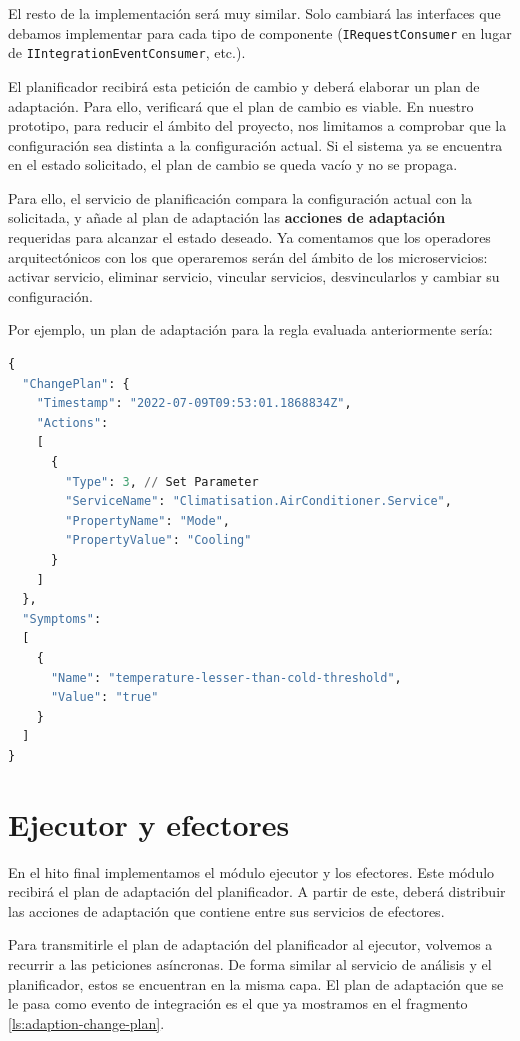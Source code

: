 El resto de la implementación será muy similar. Solo cambiará las interfaces que debamos implementar para cada tipo de componente (\texttt{IRequestConsumer} en lugar de \texttt{IIntegrationEventConsumer}, etc.).

El planificador recibirá esta petición de cambio y deberá elaborar un plan de adaptación. Para ello, verificará que el plan de cambio es viable. En nuestro prototipo, para reducir el ámbito del proyecto, nos limitamos a comprobar que la configuración sea distinta a la configuración actual. Si el sistema ya se encuentra en el estado solicitado, el plan de cambio se queda vacío y no se propaga.

Para ello, el servicio de planificación compara la configuración actual con la solicitada, y añade al plan de adaptación las \textbf{acciones de adaptación} requeridas para alcanzar el estado deseado. Ya comentamos que los operadores arquitectónicos con los que operaremos serán del ámbito de los microservicios: activar servicio, eliminar servicio, vincular servicios, desvincularlos y cambiar su configuración.

Por ejemplo, un plan de adaptación para la regla evaluada anteriormente sería:

\begin{lstlisting}[language=python,caption={Plan de adaptación generado. Solo contiene una acción de adaptación: cambiar la configuración \texttt{Mode} del servicio \texttt{AirConditioner}.},captionpos=b, label=ls:adaption-change-plan]
{
  "ChangePlan": {
    "Timestamp": "2022-07-09T09:53:01.1868834Z",
    "Actions":
    [
      {
        "Type": 3, // Set Parameter
        "ServiceName": "Climatisation.AirConditioner.Service",
        "PropertyName": "Mode",
        "PropertyValue": "Cooling"
      }
    ]
  },
  "Symptoms":
  [
    {
      "Name": "temperature-lesser-than-cold-threshold",
      "Value": "true"
    }
  ]
}
\end{lstlisting}

\section{Ejecutor y efectores}

En el hito final implementamos el módulo ejecutor y los efectores. Este módulo recibirá el plan de adaptación del planificador. A partir de este, deberá distribuir las acciones de adaptación que contiene entre sus servicios de efectores.

Para transmitirle el plan de adaptación del planificador al ejecutor, volvemos a recurrir a las peticiones asíncronas. De forma similar al servicio de análisis y el planificador, estos se encuentran en la misma capa. El plan de adaptación que se le pasa como evento de integración es el que ya mostramos en el fragmento \ref{ls:adaption-change-plan}.

